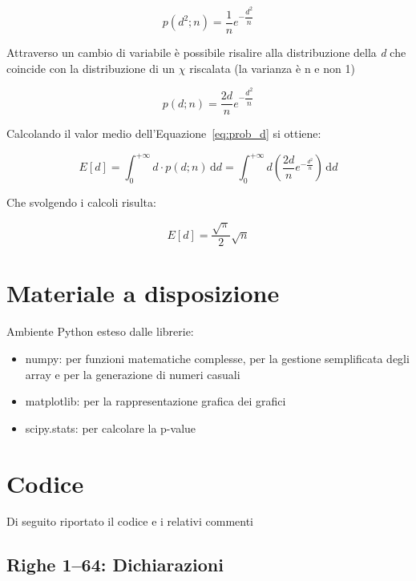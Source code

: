 \documentclass[a4paper,12pt]{article}
\begin{document}
\begin{equation}
    p(d^2;n) = \dfrac{1}{n} e^{-\dfrac{d^2}{n}}
\end{equation}

Attraverso un cambio di variabile è possibile risalire alla distribuzione della \textit{d} che coincide con la distribuzione di un $\chi$ riscalata (la varianza è n e non 1)

\begin{equation}
    p(d; n) = \dfrac{2d}{n} e ^ {-\dfrac{d^2}{n}}
    \label{eq:prob_d}
\end{equation}

Calcolando il valor medio dell'Equazione~\ref{eq:prob_d} si ottiene:

\[ E[d] = \int_{0}^{+\infty} d\cdot p(d; n) \,\mathrm{d}d = \int_{0}^{+\infty} d(\frac{2d}{n} e ^ {-\frac{d^2}{n}}) \,\mathrm{d}d \]

Che svolgendo i calcoli risulta:

\begin{equation}
    E[d] = \dfrac{\sqrt{\pi}}{2}\sqrt{n}
    \label{eq:d_funzione_n}
\end{equation}

\section{Materiale a disposizione}\label{sec:materiali}

Ambiente Python esteso dalle librerie:

\begin{itemize}
    \item numpy: per funzioni matematiche complesse, per la gestione semplificata degli array e per la generazione di numeri casuali
    \item matplotlib: per la rappresentazione grafica dei grafici
    \item scipy.stats: per calcolare la p-value
\end{itemize}

\section{Codice}

Di seguito riportato il codice e i relativi commenti



\subsection{Righe 1--64: Dichiarazioni}
\end{document}
